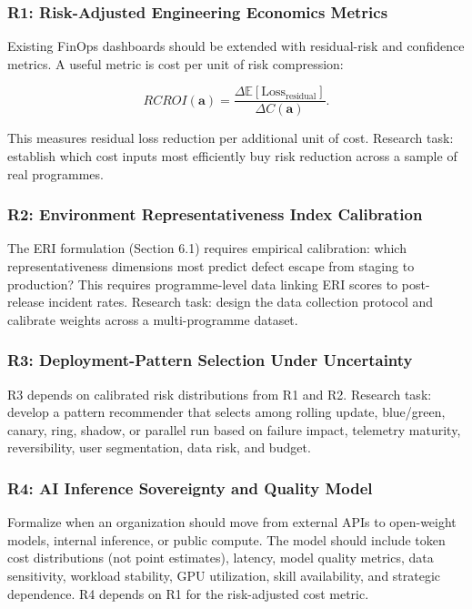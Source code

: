 \documentclass[
]{article}
\begin{document}
\subsubsection{R1: Risk-Adjusted Engineering Economics
Metrics}\label{r1-risk-adjusted-engineering-economics-metrics}

Existing FinOps dashboards should be extended with residual-risk and
confidence metrics. A useful metric is cost per unit of risk
compression:

\[RCROI(\mathbf{a}) = \frac{\Delta \mathbb{E}[\mathrm{Loss}_{\mathrm{residual}}]}{\Delta C(\mathbf{a})}.\]

This measures residual loss reduction per additional unit of cost.
Research task: establish which cost inputs most efficiently buy risk
reduction across a sample of real programmes.

\subsubsection{R2: Environment Representativeness Index
Calibration}\label{r2-environment-representativeness-index-calibration}

The ERI formulation (Section 6.1) requires empirical calibration: which
representativeness dimensions most predict defect escape from staging to
production? This requires programme-level data linking ERI scores to
post-release incident rates. Research task: design the data collection
protocol and calibrate weights across a multi-programme dataset.

\subsubsection{R3: Deployment-Pattern Selection Under
Uncertainty}\label{r3-deployment-pattern-selection-under-uncertainty}

R3 depends on calibrated risk distributions from R1 and R2. Research
task: develop a pattern recommender that selects among rolling update,
blue/green, canary, ring, shadow, or parallel run based on failure
impact, telemetry maturity, reversibility, user segmentation, data risk,
and budget.

\subsubsection{R4: AI Inference Sovereignty and Quality
Model}\label{r4-ai-inference-sovereignty-and-quality-model}

Formalize when an organization should move from external APIs to
open-weight models, internal inference, or public compute. The model
should include token cost distributions (not point estimates), latency,
model quality metrics, data sensitivity, workload stability, GPU
utilization, skill availability, and strategic dependence. R4 depends on
R1 for the risk-adjusted cost metric.
\end{document}

